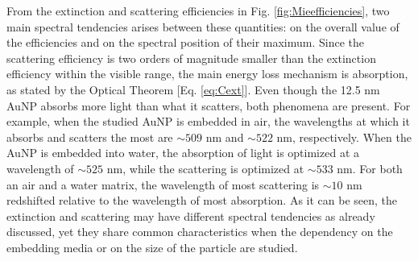 From the extinction and scattering efficiencies in Fig. \ref{fig:Mieefficiencies}, two main spectral tendencies arises between these quantities: on the overall value of the efficiencies and on the spectral position of their maximum. Since the scattering efficiency is two orders of magnitude smaller than the extinction efficiency within the visible range, the main energy loss mechanism is absorption, as stated by the Optical Theorem [Eq. \eqref{eq:Cext}]. Even though the 12.5 nm AuNP absorbs more light than what it scatters, both phenomena are present. For example, when the  studied AuNP is embedded in air, the wavelengths at which it absorbs and scatters the most are $\sim 509$ nm and $\sim 522$ nm, respectively. When the AuNP is embedded into water, the absorption of light is optimized at a wavelength of $\sim 525$ nm, while the scattering is optimized at $\sim 533$ nm. For both an air and a water matrix, the wavelength of most scattering is $\sim 10$ nm redshifted relative to the wavelength of most absorption. As it can be seen, the extinction and scattering may have different spectral tendencies as already discussed, yet they share common characteristics   when the dependency on the embedding media or on the size of the particle are studied.

 

 

 
 
